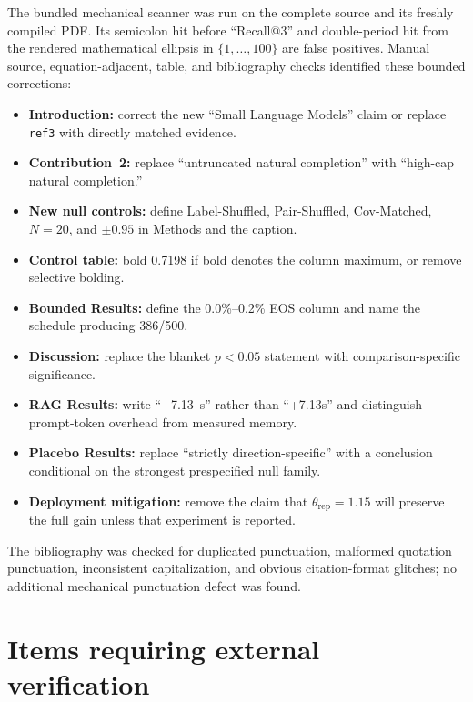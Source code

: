 \documentclass[11pt]{article}
\begin{document}
The bundled mechanical scanner was run on the complete source and its freshly compiled PDF.  Its semicolon hit before ``Recall@3'' and double-period hit from the rendered mathematical ellipsis in $\{1,\ldots,100\}$ are false positives.  Manual source, equation-adjacent, table, and bibliography checks identified these bounded corrections:

\begin{itemize}
    \item \textbf{Introduction:} correct the new ``Small Language Models'' claim or replace \texttt{ref3} with directly matched evidence.
    \item \textbf{Contribution~2:} replace ``untruncated natural completion'' with ``high-cap natural completion.''
    \item \textbf{New null controls:} define Label-Shuffled, Pair-Shuffled, Cov-Matched, $N=20$, and $\pm0.95$ in Methods and the caption.
    \item \textbf{Control table:} bold 0.7198 if bold denotes the column maximum, or remove selective bolding.
    \item \textbf{Bounded Results:} define the 0.0\%--0.2\% EOS column and name the schedule producing 386/500.
    \item \textbf{Discussion:} replace the blanket $p<0.05$ statement with comparison-specific significance.
    \item \textbf{RAG Results:} write ``+7.13~s'' rather than ``+7.13s'' and distinguish prompt-token overhead from measured memory.
    \item \textbf{Placebo Results:} replace ``strictly direction-specific'' with a conclusion conditional on the strongest prespecified null family.
    \item \textbf{Deployment mitigation:} remove the claim that $\theta_{\text{rep}}=1.15$ will preserve the full gain unless that experiment is reported.
\end{itemize}

The bibliography was checked for duplicated punctuation, malformed quotation punctuation, inconsistent capitalization, and obvious citation-format glitches; no additional mechanical punctuation defect was found.

\section*{Items requiring external verification}
\end{document}
